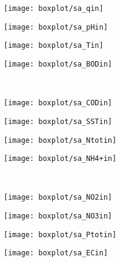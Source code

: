 \begin{figure}[h]
	\begin{subfigure}{0.24\textwidth}
		\texttt{[image: boxplot/sa\_qin]}	\centering
	\end{subfigure}
	\begin{subfigure}{0.24\textwidth}
		\texttt{[image: boxplot/sa\_pHin]}	\centering
	\end{subfigure}
	\begin{subfigure}{0.24\textwidth}
		\texttt{[image: boxplot/sa\_Tin]}	\centering
	\end{subfigure}
	\begin{subfigure}{0.24\textwidth}
		\texttt{[image: boxplot/sa\_BODin]}	\centering
	\end{subfigure}
\\[1ex]
	\begin{subfigure}{0.24\textwidth}
		\texttt{[image: boxplot/sa\_CODin]}	\centering
	\end{subfigure}
	\begin{subfigure}{0.24\textwidth}
		\texttt{[image: boxplot/sa\_SSTin]}	\centering
	\end{subfigure}
	\begin{subfigure}{0.24\textwidth}
		\texttt{[image: boxplot/sa\_Ntotin]}	\centering
	\end{subfigure}
	\begin{subfigure}{0.24\textwidth}
		\texttt{[image: boxplot/sa\_NH4+in]}	\centering
	\end{subfigure}
\\[1ex]
	\begin{subfigure}{0.24\textwidth}
		\texttt{[image: boxplot/sa\_NO2in]}	\centering
	\end{subfigure}
	\begin{subfigure}{0.24\textwidth}
		\texttt{[image: boxplot/sa\_NO3in]}	\centering
	\end{subfigure}
	\begin{subfigure}{0.24\textwidth}
		\texttt{[image: boxplot/sa\_Ptotin]}	\centering
	\end{subfigure}
	\begin{subfigure}{0.24\textwidth}
		\texttt{[image: boxplot/sa\_ECin]}	\centering
	\end{subfigure}
\\[1ex]
	\begin{subfigure}{0.24\textwidth}

\end{subfigure}
\end{figure}
